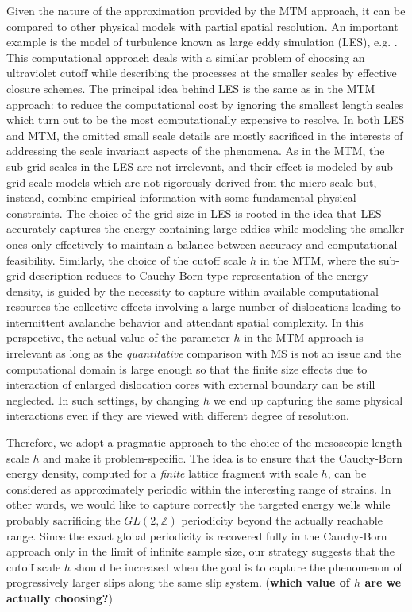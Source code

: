 \documentclass[aps,
superscriptaddress,notitlepage]{revtex4-1}
\begin{document}
  
Given the nature of the approximation provided by  the  MTM approach,  it can be compared  to other physical models with partial spatial resolution.  An important example is  the   model of turbulence known as  large eddy simulation (LES), e.g.   \cite{Sagaut2006,Davidson2009}. This  computational approach   deals with a similar problem  of choosing an ultraviolet cutoff  while  describing the processes at the smaller scales by  effective closure schemes.  The principal idea behind LES is the same as in the MTM approach: to reduce the computational cost by ignoring the smallest length scales which turn out to be the most computationally expensive to resolve. In both LES and MTM, the omitted small scale details   are  mostly sacrificed in the interests of addressing  the   scale invariant   aspects  of the phenomena. As in the MTM, the   sub-grid scales in the LES  are not  irrelevant, and their effect  is  modeled  by  sub-grid scale  models which  are not rigorously derived from the micro-scale but, instead, combine empirical information with some fundamental physical constraints. The choice of the grid size  in  LES  is rooted in  the idea   that LES accurately captures the energy-containing large eddies while modeling the smaller ones only effectively to maintain  a  balance between accuracy and computational feasibility. Similarly,  the choice of the cutoff  scale $h$ in the  MTM, where the sub-grid description reduces to Cauchy-Born type representation of the energy density,  is guided by the necessity to capture within  available  computational resources  the  collective effects involving a large number of dislocations leading to intermittent avalanche behavior  and  attendant spatial complexity. In this perspective,   the actual value of the parameter $h$ in the MTM approach is irrelevant as long as the \emph{quantitative} comparison with MS is not an issue and the computational domain is large enough so that the finite size effects due to interaction of   enlarged dislocation cores with   external boundary can be still neglected. In such settings, by changing $h$ we end up capturing  the same physical interactions even if they are viewed with different degree of resolution. 

 



Therefore, we adopt  a pragmatic  approach to the choice of the mesoscopic length scale $h$ and  make it problem-specific.  The idea is to  ensure  that  the  Cauchy-Born   energy density,  computed for a  \emph{finite} lattice fragment with  scale $h$,    can be considered as approximately periodic within  the interesting range of strains. In other words, we would like to  capture correctly  the  targeted  energy wells  while probably sacrificing the $GL(2,\mathbb Z)$ periodicity beyond the actually reachable range. Since the exact global  periodicity is recovered fully in the Cauchy-Born approach only in the limit of infinite sample size, our  strategy suggests that  the   cutoff scale $h$  should be increased  when  the goal is to capture the phenomenon of progressively larger slips along the same slip system. (\textbf{which value of $h$ are we actually choosing?})
\end{document}
